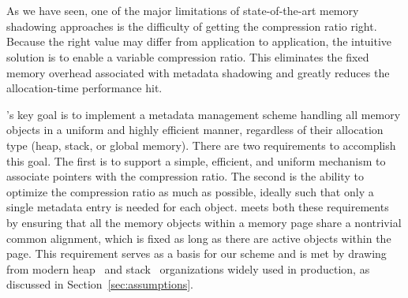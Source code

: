 \section{\projectname{}}
\label{sec:metalloc}

As we have seen, one of the major limitations of state-of-the-art
memory shadowing approaches is the difficulty of getting the compression ratio right.
Because the right value may differ from application to application, the
intuitive solution is to enable a variable compression ratio.
This eliminates the fixed memory overhead associated with metadata shadowing
and greatly reduces the allocation-time performance hit.

\projectname{}'s key goal is to implement a metadata management scheme
handling all memory objects in a uniform and highly efficient manner, regardless of
their allocation type (heap, stack, or global memory).
There are two requirements 
to accomplish this goal.
The first is to support a simple, efficient, and uniform mechanism
to associate pointers with the compression ratio. The second is the
ability to optimize the compression ratio as much as possible, ideally such that only a single
metadata entry is needed for each object. \projectname{} meets both these requirements
by ensuring that all the memory objects within a memory page
share a nontrivial common alignment, which is fixed
as long as there are active objects within the page. 
This requirement serves as a basis for our scheme and is met
by drawing from modern heap~\cite{ghemawat2009tcmalloc} and stack~\cite{kuznetsov2014cpi} organizations
widely used in production, as discussed in Section~\ref{sec:assumptions}.

